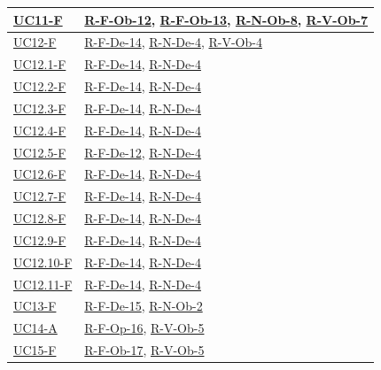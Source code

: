\begin{center}
\begin{longtable}{|p{3cm}|p{10.5cm}|}
    \hline
    \hyperref[uc:uc_lettura_can_ecu]{UC11-F} & \hyperref[req:rf11]{R-F-Ob-12}, \hyperref[req:rf22]{R-F-Ob-13}, \hyperref[req:rn8]{R-N-Ob-8}, \hyperref[req:rv7]{R-V-Ob-7} \\
    \hline
    \hyperref[uc:uc_stato_led]{UC12-F} & \hyperref[req:rf12]{R-F-De-14}, \hyperref[req:rn4]{R-N-De-4}, \hyperref[req:rv4]{R-V-Ob-4} \\
    \hline
    \hyperref[uc:uc_led_sd_mancante]{UC12.1-F} & \hyperref[req:rf12]{R-F-De-14}, \hyperref[req:rn4]{R-N-De-4} \\
    \hline
    \hyperref[uc:uc_led_errore]{UC12.2-F} & \hyperref[req:rf12]{R-F-De-14}, \hyperref[req:rn4]{R-N-De-4} \\
    \hline
    \hyperref[uc:uc_led_pairing_wifi]{UC12.3-F} & \hyperref[req:rf12]{R-F-De-14}, \hyperref[req:rn4]{R-N-De-4} \\
    \hline
    \hyperref[uc:uc_led_pairing_ble]{UC12.4-F} & \hyperref[req:rf12]{R-F-De-14}, \hyperref[req:rn4]{R-N-De-4} \\
    \hline
    \hyperref[uc:uc_led_recupero_calibrazione]{UC12.5-F} & \hyperref[req:rf14]{R-F-De-12}, \hyperref[req:rn4]{R-N-De-4} \\
    \hline
    \hyperref[uc:uc_led_calibrazione]{UC12.6-F} & \hyperref[req:rf12]{R-F-De-14}, \hyperref[req:rn4]{R-N-De-4} \\
    \hline
    \hyperref[uc:uc_led_download]{UC12.7-F} & \hyperref[req:rf12]{R-F-De-14}, \hyperref[req:rn4]{R-N-De-4} \\
    \hline
    \hyperref[uc:uc_led_eliminazione]{UC12.8-F} & \hyperref[req:rf12]{R-F-De-14}, \hyperref[req:rn4]{R-N-De-4} \\
    \hline
    \hyperref[uc:uc_led_sospensione]{UC12.9-F} & \hyperref[req:rf12]{R-F-De-14}, \hyperref[req:rn4]{R-N-De-4} \\
    \hline
    \hyperref[uc:uc_led_logging]{UC12.10-F} & \hyperref[req:rf12]{R-F-De-14}, \hyperref[req:rn4]{R-N-De-4} \\
    \hline
    \hyperref[uc:uc_led_standby]{UC12.11-F} & \hyperref[req:rf12]{R-F-De-14}, \hyperref[req:rn4]{R-N-De-4} \\
    \hline
    \hyperref[uc:uc_sospensione_sensori]{UC13-F} & \hyperref[req:rf13]{R-F-De-15}, \hyperref[req:rn2]{R-N-Ob-2} \\
    \hline
    \hyperref[uc:uc_config_timeout]{UC14-A} & \hyperref[req:rf14]{R-F-Op-16}, \hyperref[req:rv5]{R-V-Ob-5} \\
    \hline
    \hyperref[uc:uc_sessione_ble]{UC15-F} & \hyperref[req:rf15]{R-F-Ob-17}, \hyperref[req:rv5]{R-V-Ob-5} \\

\end{longtable}
\end{center}
